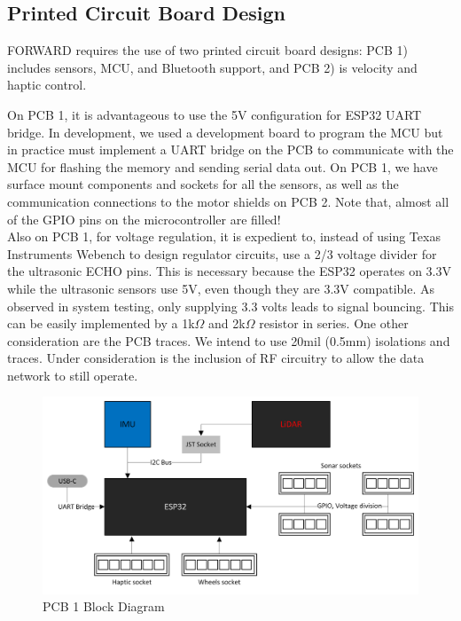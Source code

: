 \subsection{Printed Circuit Board Design} \label{sec:pcb-design}
\noindent FORWARD requires the use of two printed circuit board designs: PCB 1) includes sensors, MCU, and Bluetooth support, and PCB 2)  is velocity and haptic control.

\noindent On PCB 1, it is advantageous to use the 5V configuration for ESP32 UART bridge. In development, we used a development board to program the MCU but in practice must implement a UART bridge on the PCB to communicate with the MCU for flashing the memory and sending serial data out. On PCB 1, we have surface mount components and sockets for all the sensors, as well as the communication connections to the motor shields on PCB 2.  Note that, almost all of the GPIO pins on the microcontroller are filled!\\

\noindent Also on PCB 1, for voltage regulation, it is expedient to, instead of using Texas Instruments Webench to design regulator circuits, use a 2/3 voltage divider for the ultrasonic ECHO pins. This is necessary because the ESP32 operates on 3.3V while the ultrasonic sensors use 5V, even though they are 3.3V compatible. As observed in system testing, only supplying 3.3 volts leads to signal bouncing. This can be easily implemented by a 1k$\Omega$ and 2k$\Omega$ resistor in series. One other consideration are the PCB traces. We intend to use 20mil (0.5mm) isolations and traces. Under consideration is the inclusion of RF circuitry to allow the data network to still operate.\\

\begin{figure}[H]
	\centering
	\includegraphics[width=\textwidth]{./Images/PCB1-Block-Diagram.png}
	\caption{\label{fig:pcb}PCB 1 Block Diagram}
\end{figure}

